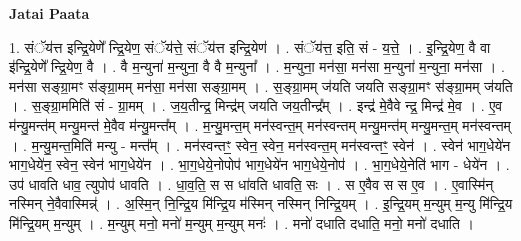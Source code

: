 \documentclass[17pt]{extarticle}
\begin{document}
\textbf{Jatai Paata} \newline

1. संॅय॑त्त इन्द्रि॒येणे᳚ न्द्रि॒येण॒ संॅय॑त्ते॒ संॅय॑त्त इन्द्रि॒येण॑ । . संॅय॑त्त॒ इति॒ सं - य॒त्ते॒ । . इ॒न्द्रि॒येण॒ वै वा इ॑न्द्रि॒येणे᳚ न्द्रि॒येण॒ वै । . वै म॒न्युना॑ म॒न्युना॒ वै वै म॒न्युना᳚ । . म॒न्युना॒ मन॑सा॒ मन॑सा म॒न्युना॑ म॒न्युना॒ मन॑सा । . मन॑सा सङ्ग्रा॒मꣳ स॑ङ्ग्रा॒मम् मन॑सा॒ मन॑सा सङ्ग्रा॒मम् । . स॒ङ्ग्रा॒मम् ज॑यति जयति सङ्ग्रा॒मꣳ स॑ङ्ग्रा॒मम् ज॑यति । . स॒ङ्ग्रा॒ममिति॑ सं - ग्रा॒मम् । . ज॒य॒तीन्द्र॒ मिन्द्र॑म् जयति जय॒तीन्द्र᳚म् । . इन्द्र॑ मे॒वैवे न्द्र॒ मिन्द्र॑ मे॒व । . ए॒व म॑न्यु॒मन्त॑म् मन्यु॒मन्त॑ मे॒वैव म॑न्यु॒मन्त᳚म् । . म॒न्यु॒मन्त॒म् मन॑स्वन्त॒म् मन॑स्वन्तम् मन्यु॒मन्त॑म् मन्यु॒मन्त॒म् मन॑स्वन्तम् । . म॒न्यु॒मन्त॒मिति॑ मन्यु - मन्त᳚म् । . मन॑स्वन्तꣳ॒॒ स्वेन॒ स्वेन॒ मन॑स्वन्त॒म् मन॑स्वन्तꣳ॒॒ स्वेन॑ । . स्वेन॑ भाग॒धेये॑न भाग॒धेये॑न॒ स्वेन॒ स्वेन॑ भाग॒धेये॑न । . भा॒ग॒धेये॒नोपोप॑ भाग॒धेये॑न भाग॒धेये॒नोप॑ । . भा॒ग॒धेये॒नेति॑ भाग - धेये॑न । . उप॑ धावति धाव॒ त्युपोप॑ धावति । . धा॒व॒ति॒ स स धा॑वति धावति॒ सः । . स ए॒वैव स स ए॒व । . ए॒वास्मि॑न् नस्मिन् ने॒वैवास्मिन्न्॑ । . अ॒स्मि॒न् नि॒न्द्रि॒य मि॑न्द्रि॒य म॑स्मिन् नस्मिन् निन्द्रि॒यम् । . इ॒न्द्रि॒यम् म॒न्युम् म॒न्यु मि॑न्द्रि॒य मि॑न्द्रि॒यम् म॒न्युम् । . म॒न्युम् मनो॒ मनो॑ म॒न्युम् म॒न्युम् मनः॑ । . मनो॑ दधाति दधाति॒ मनो॒ मनो॑ दधाति । \newline
\end{document}
